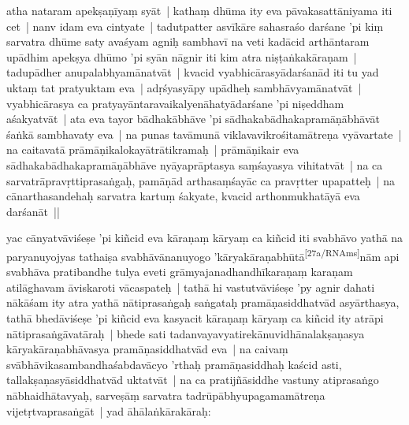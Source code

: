 \documentclass[article,a4paper]{memoir}
\begin{document}
	  \pstart atha nataram apekṣaṇī\-yaṃ syā\-t | \label{sarit__ratnakīrtinibandhāvali__126671}kathaṃ dhū\-ma ity eva pā\-vakasattā\-niyama iti cet | nanv idam eva cintyate | tadutpatter asvī\-kā\-re sahasraśo darśane 'pi kiṃ sarvatra dhū\-me saty avaśyam agniḥ sambhavī\- na veti\label{sarit__ratnakīrtinibandhāvali__126898} kadā\-cid arthā\-ntaram upā\-dhim apekṣya dhū\-mo 'pi syā\-n nā\-gnir iti kim atra niṣṭaṅkakā\-raṇam | tadupā\-dher anupalabhyamā\-natvā\-t | kvacid vyabhicā\-rasyā\-darśanā\-d iti tu yad uktaṃ tat pratyuktam eva | adṛśyasyā\-py upā\-dheḥ sambhā\-vyamā\-natvā\-t | vyabhicā\-rasya ca pratyayā\-ntaravaikalyenā\-hatyā\-darśane 'pi niṣeddham aśakyatvā\-t | ata eva tayor bā\-dhakā\-bhā\-ve 'pi sā\-dhakabā\-dhakapramā\-ṇā\-bhā\-vā\-t śaṅkā\- sambhavaty eva | na punas tavā\-munā\- viklavavikrośitamā\-treṇa vyā\-vartate | na caitavatā\- prā\-mā\-ṇikalokayā\-trā\-tikramaḥ | prā\-mā\-ṇikair eva sā\-dhakabā\-dhakapramā\-ṇā\-bhā\-ve nyā\-yaprā\-ptasya saṃśayasya vihitatvā\-t | na ca sarvatrā\-pravṛttiprasaṅgaḥ, pamā\-ṇā\-d arthasaṃśayā\-c ca pravṛtter upapatteḥ | na cā\-narthasandehaḥ sarvatra kartuṃ śakyate, kvacid arthonmukhatā\-yā\- eva darśanā\-t ||
	\pend
      

	  \pstart yac cā\-nyatvā\-viśeṣe 'pi kiñcid eva kā\-raṇaṃ kā\-ryaṃ ca kiñcid iti svabhā\-vo yathā\- na paryanuyojyas tathaiṣa svabhā\-vā\-nanuyogo 'kā\-ryakā\-raṇabhū\-tā\-\leavevmode\textsuperscript{\rmlatinfont\tiny [27a/RNAms]}nā\-m api svabhā\-va pratibandhe tulya eveti grā\-myajanadhandhī\-karaṇaṃ karaṇam atilā\-ghavam ā\-viskaroti vā\-caspateḥ | tathā\- hi vastutvā\-viśeṣe 'py agnir dahati nā\-kā\-śam ity atra yathā\- nā\-tiprasaṅgaḥ saṅgataḥ pramā\-ṇasiddhatvā\-d asyā\-rthasya, tathā\- bhedā\-viśeṣe 'pi kiñcid eva kasyacit kā\-raṇaṃ kā\-ryaṃ ca kiñcid ity atrā\-pi nā\-tiprasaṅgā\-vatā\-raḥ | bhede sati tadanvayavyatirekā\-nuvidhā\-nalakṣaṇasya kā\-ryakā\-raṇabhā\-vasya pramā\-ṇasiddhatvā\-d eva | na caivaṃ svā\-bhā\-vikasambandhaśabdavā\-cyo 'rthaḥ pramā\-ṇasiddhaḥ kaścid asti, tallakṣaṇasyā\-siddhatvā\-d uktatvā\-t | na ca pratijñā\-siddhe vastuny atiprasaṅgo nā\-bhaidhā\-tavyaḥ, sarveṣā\-ṃ sarvatra tadrū\-pā\-bhyupagamamā\-treṇa vijetṛtvaprasaṅgā\-t | yad ā\-hā\-laṅkā\-rakā\-raḥ:
	\pend
      
\end{document}
